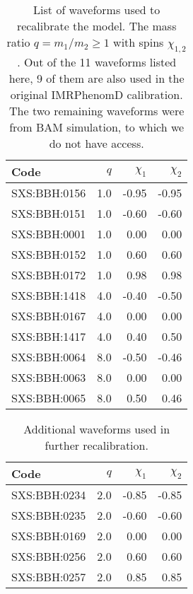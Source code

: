 \documentclass[twocolumn]{aastex631}
\begin{document}
\begin{table}[t]
	\centering
	\begin{tabularx}{0.8\columnwidth}{@{\extracolsep{\fill}}lrrr}
		\toprule\midrule
		Code         & $q$ & $\chi_1$ & $\chi_2$ \\ \midrule\midrule
		SXS:BBH:0156 & 1.0 & -0.95    & -0.95    \\
		SXS:BBH:0151 & 1.0 & -0.60    & -0.60    \\
		SXS:BBH:0001 & 1.0 &  0.00    &  0.00    \\
		SXS:BBH:0152 & 1.0 &  0.60    &  0.60    \\
		SXS:BBH:0172 & 1.0 &  0.98    &  0.98    \\
		SXS:BBH:1418 & 4.0 & -0.40    & -0.50    \\
		SXS:BBH:0167 & 4.0 &  0.00    &  0.00    \\
		SXS:BBH:1417 & 4.0 &  0.40    &  0.50    \\
		SXS:BBH:0064 & 8.0 & -0.50    & -0.46    \\
		SXS:BBH:0063 & 8.0 &  0.00    &  0.00    \\
		SXS:BBH:0065 & 8.0 &  0.50    &  0.46    \\ \midrule\bottomrule
	\end{tabularx}
	\caption{List of waveforms used to recalibrate the model. The mass ratio $q=m_1/m_2\geq 1$ with spins $\chi_{1,2}$. Out of the 11 waveforms listed here, 9 of them are also used in the original IMRPhenomD calibration. \citep{khan2016frequency} The two remaining waveforms were from BAM simulation, to which we do not have access.}
	\label{tab:q148}
\end{table}
\begin{table}[t]
	\centering
	\begin{tabularx}{0.8\columnwidth}{@{\extracolsep{\fill}}lrrr}
		\toprule\midrule
		Code         & $q$ & $\chi_1$ & $\chi_2$ \\ \midrule\midrule
		SXS:BBH:0234 & 2.0 & -0.85    & -0.85    \\
		SXS:BBH:0235 & 2.0 & -0.60    & -0.60    \\
		SXS:BBH:0169 & 2.0 & 0.00     & 0.00     \\
		SXS:BBH:0256 & 2.0 & 0.60     & 0.60     \\
		SXS:BBH:0257 & 2.0 & 0.85     & 0.85     \\ \midrule\bottomrule
	\end{tabularx}
	\caption{Additional waveforms used in further recalibration.}
	\label{tab:q1248}
\end{table}
\end{document}
